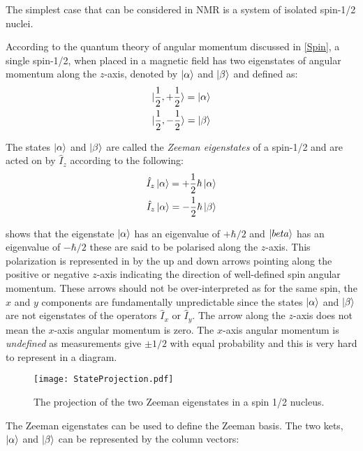 The simplest case that can be considered in NMR is a system of isolated
spin-1/2 nuclei.

According to the quantum theory of angular momentum discussed in \ref{Spin}, a
single spin-1/2, when placed in a magnetic field has two eigenstates of angular
momentum along the $z$-axis, denoted by $\ket{\alpha}$ and $\ket{\beta}$ and defined
as:
\begin{align}
  \ket{\frac{1}{2},+\frac{1}{2}} = \ket{\alpha}\\
  \ket{\frac{1}{2},-\frac{1}{2}} = \ket{\beta}
 \end{align}

The states $\ket{\alpha}$ and $\ket{\beta}$ are called the \textit{Zeeman eigenstates}
of a spin-1/2 and are acted on by $\hat{I}_z$ according to the following:
\begin{align}\label{eqn:momentum}
  \hat{I}_z\ket{\alpha} = +\frac{1}{2}\hbar\ket{\alpha}\\
  \hat{I}_z\ket{\alpha} = -\frac{1}{2}\hbar\ket{\beta}
\end{align}

 shows that the eigenstate $\ket{\alpha}$ has an eigenvalue of
$+\hbar/2$ and $\ket{beta}$ has an eigenvalue of $-\hbar/2$ these are said to
be polarised along the $z$-axis. This polarization is represented in
 by the up and down arrows pointing along the positive
or negative $z$-axis indicating the direction of well-defined spin angular momentum.
These arrows should not be over-interpreted as for the same spin,
the $x$ and $y$ components are fundamentally unpredictable
since the states $\ket{\alpha}$ and $\ket{\beta}$ are not eigenstates of the operators
$\hat{I}_x$ or $\hat{I}_y$. The arrow along the $z$-axis does not mean the
$x$-axis angular momentum is zero. The $x$-axis angular momentum is \textit{undefined}
as measurements give $±1/2$ with equal probability and this is very hard to represent
in a diagram.

\begin{figure}
  \begin{center}
  \texttt{[image: StateProjection.pdf]}
  \end{center}
  \caption{The projection of the two Zeeman eigenstates in a spin 1/2 nucleus.}
  \label{fig:Projection}
\end{figure}


The Zeeman eigenstates can be used to define the Zeeman basis. The two kets, $\ket{\alpha}$ and $\ket{\beta}$ can be represented by the column vectors:

